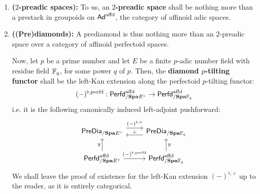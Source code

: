                 \begin{definition}[Prediamonds] \label{def: prediamonds}
                    \noindent
                    \begin{enumerate}
                        \item \textbf{($2$-preadic spaces):} To us, an \textbf{$2$-preadic space} shall be nothing more than a prestack in groupoids on $\mathsf{Ad}^{\mathrm{affd}}$, the category of affinoid adic spaces.
                        \item \textbf{((Pre)diamonds):} A prediamond is thus nothing more than an $2$-preadic space over a category of affinoid perfectoid spaces.
                        
                        Now, let $p$ be a prime number and let $E$ be a finite $p$-adic number field with residue field $\mathbb{F}_q$, for some power $q$ of $p$. Then, the \textbf{diamond $p$-tilting functor} shall be the left-Kan extension along the perfectoid $p$-tilting functor:
                            $$(-)^{\flat, \mathrm{perfd}}: \mathsf{Perfd}^{\mathrm{affd}}_{/\mathbf{Spa} E^{\circ}} \to \mathsf{Perfd}^{\mathrm{affd}}_{/\mathbf{Spa} \mathbb{F}_q}$$
                        i.e. it is the following canonically induced left-adjoint pushforward:
                            $$
                                \begin{tikzcd}
                                	{\Pre\Dia_{/\Spa E^{\circ}}} & {\Pre\Dia_{/\Spa \F_q}} \\
                                	{\Perfd^{\affd}_{/\Spa E^{\circ}}} & {\Perfd^{\affd}_{/\Spa \F_q}}
                                	\arrow["{(-)^{\flat, \perfd}}", from=2-1, to=2-2]
                                	\arrow[""{name=0, anchor=center, inner sep=0}, shift left=2, from=1-2, to=1-1]
                                	\arrow["y", from=2-1, to=1-1]
                                	\arrow["y"', from=2-2, to=1-2]
                                	\arrow[""{name=1, anchor=center, inner sep=0}, "{(-)^{\flat, \diamond}}", shift left=2, from=1-1, to=1-2]
                                	\arrow["\dashv"{anchor=center, rotate=-90}, draw=none, from=1, to=0]
                                \end{tikzcd}
                            $$
                        We shall leave the proof of existence for the left-Kan extension $(-)^{\flat, \diamond}$ up to the reader, as it is entirely categorical.
                    \end{enumerate}
                \end{definition}
                
